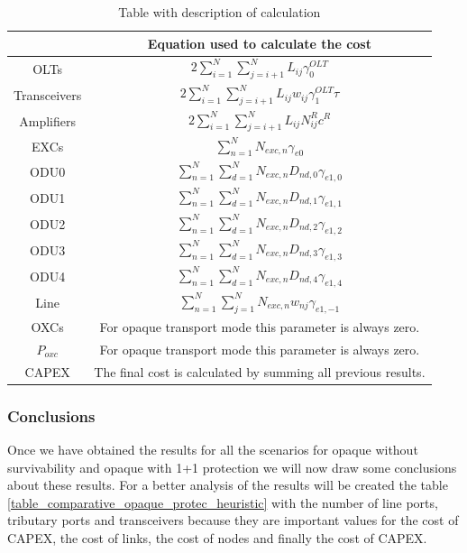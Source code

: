 \begin{table}[h!]
\centering
\begin{tabular}{|| c | c ||}
 \hline
  & Equation used to calculate the cost \\ \hline
 OLTs & \(\displaystyle 2 \sum_{i=1}^{N}\sum_{j=i+1}^{N} L_{ij} \gamma_0^{OLT} \) \\ \hline
 Transceivers & \(\displaystyle 2 \sum_{i=1}^{N}\sum_{j=i+1}^{N} L_{ij} w_{ij} \gamma_1^{OLT} \tau \) \\ \hline
 Amplifiers & \(\displaystyle 2 \sum_{i=1}^{N}\sum_{j=i+1}^{N} L_{ij} N^R_{ij} c^R \) \\ \hline
 EXCs & \(\displaystyle \sum_{n=1}^N N_{exc,n} \gamma_{e0} \) \\ \hline
 ODU0 & \(\displaystyle \sum_{n=1}^{N} \sum_{d=1}^{N} N_{exc,n} D_{nd,0} \gamma_{e1,0} \) \\ \hline
 ODU1 & \(\displaystyle \sum_{n=1}^{N} \sum_{d=1}^{N} N_{exc,n} D_{nd,1} \gamma_{e1,1} \) \\ \hline
 ODU2 & \(\displaystyle \sum_{n=1}^{N} \sum_{d=1}^{N} N_{exc,n} D_{nd,2} \gamma_{e1,2} \)\\ \hline
 ODU3 & \(\displaystyle \sum_{n=1}^{N} \sum_{d=1}^{N} N_{exc,n} D_{nd,3} \gamma_{e1,3} \) \\ \hline
 ODU4 & \(\displaystyle \sum_{n=1}^{N} \sum_{d=1}^{N} N_{exc,n} D_{nd,4} \gamma_{e1,4} \) \\ \hline
 Line & \(\displaystyle \sum_{n=1}^{N} \sum_{j=1}^{N} N_{exc,n} w_{nj} \gamma_{e1,-1} \) \\ \hline
 OXCs & For opaque transport mode this parameter is always zero. \\ \hline
 $P_{oxc}$ & For opaque transport mode this parameter is always zero. \\ \hline
 CAPEX & The final cost is calculated by summing all previous results. \\
 \hline
 \end{tabular}
\caption{Table with description of calculation}
\label{formulas_opaque_protec_ref_high_heuristic}
\end{table}

\vspace{15pt}

\subsubsection{Conclusions}

Once we have obtained the results for all the scenarios for opaque without survivability and opaque with 1+1 protection we will now draw some conclusions about these results. For a better analysis of the results will be created the table \ref{table_comparative_opaque_protec_heuristic} with the number of line ports, tributary ports and transceivers because they are important values for the cost of CAPEX, the cost of links, the cost of nodes and finally the cost of CAPEX.\\

